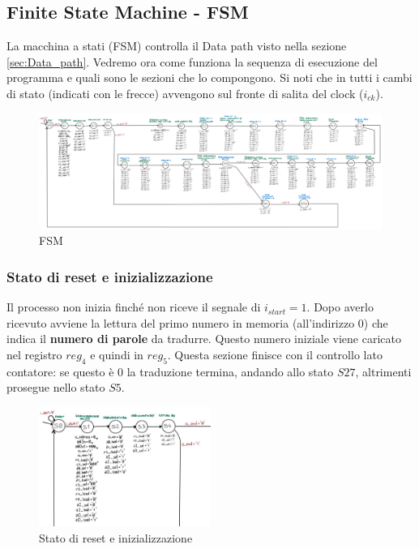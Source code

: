 \documentclass[12pt]{article} %
\begin{document}
		\subsection{Finite State Machine - FSM}
			La macchina a stati (FSM) controlla il Data path visto nella sezione \ref{sec:Data_path}. 
			Vedremo ora come funziona la sequenza di esecuzione del programma  e quali sono le sezioni che lo 
			compongono. Si noti che in tutti i cambi di stato (indicati con le frecce) avvengono sul fronte
			di salita del clock ($i_{ck}$).
			\begin{figure}[h]
				\centering
				\includegraphics[width=\textwidth]{FSM.jpg}
				\caption{FSM}
				\label{fig:FSM}
			\end{figure}
			\subsubsection{Stato di reset e inizializzazione}	
				Il processo non inizia finché non riceve il segnale di $i_{start} = 1$. Dopo averlo ricevuto avviene la
				lettura del primo numero in memoria (all'indirizzo 0) che indica il \textbf{numero di parole} da tradurre.
				Questo numero iniziale viene caricato nel registro $reg_4$ e quindi in $reg_5$. Questa sezione 
				finisce con il controllo lato contatore: se questo è 0 la traduzione termina, andando 
				allo stato $S27$, altrimenti prosegue nello stato $S5$.
				\begin{figure}[h]
					\centering
					\includegraphics[width=0.5\textwidth]{FSM_inizializzazione.jpg}
					\caption{Stato di reset e inizializzazione}
					\label{fig:FSM_inizializzazione}
				\end{figure}
				\newpage
\end{document}
